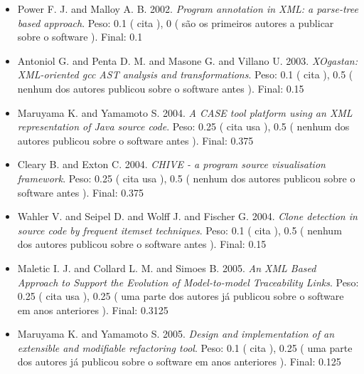 \begin{itemize}
\item Power F. J. and Malloy A. B.
      2002.
        \textit{ Program annotation in XML: a parse-tree based approach}.
      Peso:
      0.1 (
          cita
      ),
      0 (
são os primeiros autores a publicar sobre o software
      ).
      Final:
      0.1

\item Antoniol G. and Penta D. M. and Masone G. and Villano U.
      2003.
        \textit{ XOgastan: XML-oriented gcc AST analysis and transformations}.
      Peso:
      0.1 (
          cita
      ),
      0.5 (
nenhum dos autores publicou sobre o software antes
      ).
      Final:
      0.15

\item Maruyama K. and Yamamoto S.
      2004.
        \textit{ A CASE tool platform using an XML representation of Java source code}.
      Peso:
      0.25 (
          cita
          usa
      ),
      0.5 (
nenhum dos autores publicou sobre o software antes
      ).
      Final:
      0.375

\item Cleary B. and Exton C.
      2004.
        \textit{ CHIVE - a program source visualisation framework}.
      Peso:
      0.25 (
          cita
          usa
      ),
      0.5 (
nenhum dos autores publicou sobre o software antes
      ).
      Final:
      0.375

\item Wahler V. and Seipel D. and Wolff J. and Fischer G.
      2004.
        \textit{ Clone detection in source code by frequent itemset techniques}.
      Peso:
      0.1 (
          cita
      ),
      0.5 (
nenhum dos autores publicou sobre o software antes
      ).
      Final:
      0.15

\item Maletic I. J. and Collard L. M. and Simoes B.
      2005.
        \textit{ An XML Based Approach to Support the Evolution of Model-to-model Traceability Links}.
      Peso:
      0.25 (
          cita
          usa
      ),
      0.25 (
uma parte dos autores já publicou sobre o software em anos anteriores
      ).
      Final:
      0.3125

\item Maruyama K. and Yamamoto S.
      2005.
        \textit{ Design and implementation of an extensible and modifiable refactoring tool}.
      Peso:
      0.1 (
          cita
      ),
      0.25 (
uma parte dos autores já publicou sobre o software em anos anteriores
      ).
      Final:
      0.125


\end{itemize}
